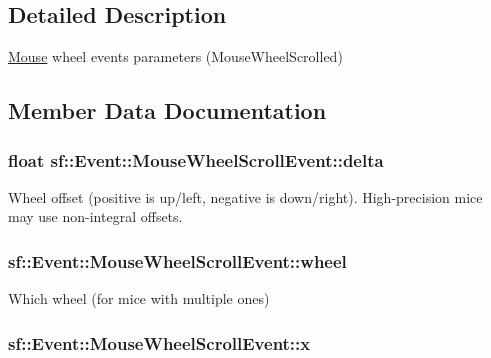 \subsection{Detailed Description}
\hyperlink{classsf_1_1_mouse}{Mouse} wheel events parameters (Mouse\-Wheel\-Scrolled) 

\subsection{Member Data Documentation}
\hypertarget{structsf_1_1_event_1_1_mouse_wheel_scroll_event_ac45c164997a594d424071e74b53b5817}{
\subsubsection[{delta}]{\setlength{\rightskip}{0pt plus 5cm}float sf\-::\-Event\-::\-Mouse\-Wheel\-Scroll\-Event\-::delta}}\label{structsf_1_1_event_1_1_mouse_wheel_scroll_event_ac45c164997a594d424071e74b53b5817}


Wheel offset (positive is up/left, negative is down/right). High-\/precision mice may use non-\/integral offsets. 

\hypertarget{structsf_1_1_event_1_1_mouse_wheel_scroll_event_a1d82dccecc46968d517b2fc66639dd74}{
\subsubsection[{wheel}]{ sf\-::\-Event\-::\-Mouse\-Wheel\-Scroll\-Event\-::wheel}}\label{structsf_1_1_event_1_1_mouse_wheel_scroll_event_a1d82dccecc46968d517b2fc66639dd74}


Which wheel (for mice with multiple ones) 

\hypertarget{structsf_1_1_event_1_1_mouse_wheel_scroll_event_a3d17cae0568d18083f879655abdc8ae4}{
\subsubsection[{x}]{ sf\-::\-Event\-::\-Mouse\-Wheel\-Scroll\-Event\-::x}}\label{structsf_1_1_event_1_1_mouse_wheel_scroll_event_a3d17cae0568d18083f879655abdc8ae4}


